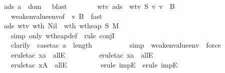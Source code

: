 \begin{isabellebody}
\ \ \ \ \ \ \isamarkupfalse \ ads{\isacharcolon}\ {\isachardoublequoteopen}{\isacharquery}a\ {\isasymnotin}\ dom\ {\isasymSigma}{\isachardoublequoteclose}\ \isamarkupfalse \ blast\ \isamarkupfalse \isanewline
\ \ \ \ \ \ \isamarkupfalse \ wtv\ ads\ \isamarkupfalse \ wtv{\isacharunderscore}{}{\isacharcolon}\ {\isachardoublequoteopen}{\isacharquery}S{}\ {\isasymturnstile}v\ v\ {\isacharcolon}\ B{\isachardoublequoteclose}\ \isanewline
\ \ \ \ \ \ \ \ \isamarkupfalse \ weaken{\isacharunderscore}value{\isacharunderscore}env{\isacharbrackleft}of\ {\isasymSigma}\ v\ B{\isacharbrackright}\ \isamarkupfalse \ fast\ \isamarkupfalse \isanewline
\ \ \ \ \ \ \isamarkupfalse \ ads\ wtv{\isacharunderscore}{}\ wt{\isacharunderscore}h\ Nil\ \isamarkupfalse \ wt{\isacharunderscore}h{}{\isacharcolon}\ {\isachardoublequoteopen}wt{\isacharunderscore}heap\ {\isacharquery}S{}\ {\isacharquery}M{}\ {\isacharbraceleft}{\isacharbraceright}{\isachardoublequoteclose}\isanewline
\ \ \ \ \ \ \ \ \isamarkupfalse \ {\isacharparenleft}simp\ only{\isacharcolon}\ wt{\isacharunderscore}heap{\isacharunderscore}def{\isacharparenright}\ \isamarkupfalse \ {\isacharparenleft}rule\ conjI{\isacharparenright}\isanewline
\ \ \ \ \ \ \ \ \isamarkupfalse \ clarify\ \isamarkupfalse \ {\isacharparenleft}case{\isacharunderscore}tac\ {\isachardoublequoteopen}a\ {\isacharequal}\ length\ {\isasymmu}{\isachardoublequoteclose}{\isacharparenright}\isanewline
\ \ \ \ \ \ \ \ \isamarkupfalse \ simp\ \isamarkupfalse \ weaken{\isacharunderscore}value{\isacharunderscore}env\ \isamarkupfalse \ force\isanewline
\ \ \ \ \ \ \ \ \isamarkupfalse \ {\isacharparenleft}erule{\isacharunderscore}tac\ x{\isacharequal}a\ \ allE{\isacharparenright}\isanewline
\ \ \ \ \ \ \ \ \isamarkupfalse \ {\isacharparenleft}erule{\isacharunderscore}tac\ x{\isacharequal}a\ \ allE{\isacharparenright}\isanewline
\ \ \ \ \ \ \ \ \isamarkupfalse \ {\isacharparenleft}erule{\isacharunderscore}tac\ x{\isacharequal}A\ \ allE{\isacharparenright}\isanewline
\ \ \ \ \ \ \ \ \isamarkupfalse \ {\isacharparenleft}erule\ impE{\isacharparenright}\ \isamarkupfalse \ {\isacharparenleft}erule\ impE{\isacharparenright}\isanewline

\end{isabellebody}
